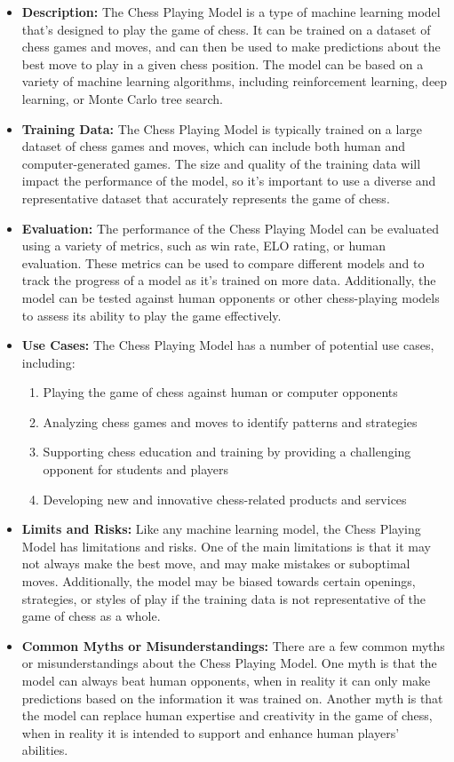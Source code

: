 \begin{itemize}
    \item \textbf{Description:} The Chess Playing Model is a type of machine learning model that's designed to play the game of chess. It can be trained on a dataset of chess games and moves, and can then be used to make predictions about the best move to play in a given chess position. The model can be based on a variety of machine learning algorithms, including reinforcement learning, deep learning, or Monte Carlo tree search.
    \item \textbf{Training Data:} The Chess Playing Model is typically trained on a large dataset of chess games and moves, which can include both human and computer-generated games. The size and quality of the training data will impact the performance of the model, so it's important to use a diverse and representative dataset that accurately represents the game of chess.
    \item \textbf{Evaluation:} The performance of the Chess Playing Model can be evaluated using a variety of metrics, such as win rate, ELO rating, or human evaluation. These metrics can be used to compare different models and to track the progress of a model as it's trained on more data. Additionally, the model can be tested against human opponents or other chess-playing models to assess its ability to play the game effectively.
    \item \textbf{Use Cases:} The Chess Playing Model has a number of potential use cases, including:
        \begin{enumerate}  
            \item Playing the game of chess against human or computer opponents
            \item Analyzing chess games and moves to identify patterns and strategies
            \item Supporting chess education and training by providing a challenging opponent for students and players
            \item Developing new and innovative chess-related products and services
        \end{enumerate}
    \item \textbf{Limits and Risks:} Like any machine learning model, the Chess Playing Model has limitations and risks. One of the main limitations is that it may not always make the best move, and may make mistakes or suboptimal moves. Additionally, the model may be biased towards certain openings, strategies, or styles of play if the training data is not representative of the game of chess as a whole.
    \item \textbf{Common Myths or Misunderstandings:} There are a few common myths or misunderstandings about the Chess Playing Model. One myth is that the model can always beat human opponents, when in reality it can only make predictions based on the information it was trained on. Another myth is that the model can replace human expertise and creativity in the game of chess, when in reality it is intended to support and enhance human players' abilities.
\end{itemize}

